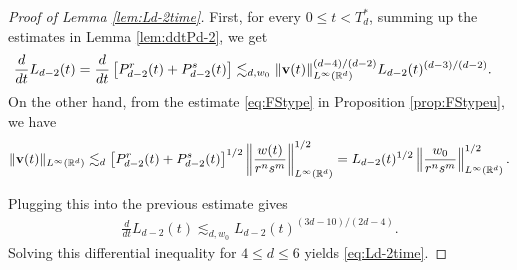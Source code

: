 \documentclass[11pt]{amsart}
\theoremstyle{definition}
\theoremstyle{remark}
\numberwithin{equation}{section}
\numberwithin{equation}{section}
\newcommand{\nrm}[1]{\Vert#1\Vert}
\newcommand{\0}{\emptyset}
\newcommand{\ift}{\infty}
\newcommand{\bfv}{{\bf v}}
\newcommand{\bbR}{\mathbb R}
\begin{document}
	\begin{proof}[Proof of Lemma \ref{lem:Ld-2time}]
		First, for every $0\le t<T_d^*$, summing up the estimates in Lemma \ref{lem:ddtPd-2}, we get 
		\begin{equation}
			\begin{aligned}
				\frac{d}{dt}L_{d-2}(t)&=\frac{d}{dt}\left[P_{d-2}^{r}(t)+P_{d-2}^{s}(t)\right] \lesssim_ {d,w_0} \nrm{\bfv(t)}_{L^{\ift}(\bbR^{d})}^{(d-4)/(d-2)}L_{d-2}(t)^{(d-3)/(d-2)}.
			\end{aligned}
		\end{equation}
		On the other hand, from the estimate \eqref{eq:FStype} in Proposition \ref{prop:FStypeu}, we have
		\begin{equation}\label{eq:utLd-2}
			\nrm{\bfv(t)}_{L^{\ift}(\bbR^{d})}\lesssim_d \left[P_{d-2}^{r}(t)+P_{d-2}^{s}(t)\right]^{1/2}\left\| \frac{w(t)}{r^{n}s^{m}}\right\|_{L^{\ift}(\bbR^{d})}^{1/2}=L_{d-2}(t)^{1/2}\left\| \frac{w_{0}}{r^{n}s^{m}}\right\|_{L^{\ift}(\bbR^{d})}^{1/2}.
		\end{equation}

		Plugging this into the previous estimate gives
		\begin{equation}
			\begin{aligned}
				\frac{d}{dt}L_{d-2}(t) \lesssim_{d,w_0} L_{d-2}(t)^{(3d-10)/(2d-4)}.
			\end{aligned}
		\end{equation}
		Solving this differential inequality for $4\le d \le 6$ yields \eqref{eq:Ld-2time}. 

		

\end{proof}
\end{document}

